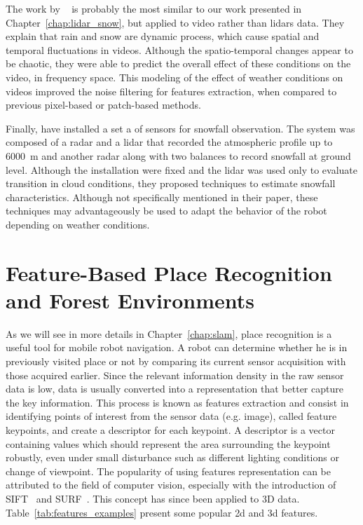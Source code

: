 The work by ~\citet{barnum2010analysis} is probably the most similar to our work presented in Chapter~\ref{chap:lidar_snow}, but applied to video rather than \gls*{lidar}s data. They explain that rain and snow are dynamic process, which cause spatial and temporal fluctuations in videos. Although the spatio-temporal changes appear to be chaotic, they were able to predict the overall effect of these conditions on the video, in frequency space. This modeling of the effect of weather conditions on videos improved the noise filtering for features extraction, when compared to previous pixel-based or patch-based methods.

Finally, \citet{servomaa2002snowfall} have installed a set a of sensors for snowfall observation. The system was composed of a radar and a \gls*{lidar} that recorded the atmospheric profile up to \SI{6000}{\meter} and another radar along with two balances to record snowfall at ground level. Although the installation were fixed and the \gls*{lidar} was used only to evaluate transition in cloud conditions, they proposed techniques to estimate snowfall characteristics. Although not specifically mentioned in their paper, these techniques may advantageously be used to adapt the behavior of the robot depending on weather conditions.  



\section{Feature-Based Place Recognition and Forest Environments}
\label{sec:literature_slam}

As we will see in more details in Chapter~\ref{chap:slam}, place recognition is a useful tool for mobile robot navigation. A robot can determine whether he is in previously visited place or not by comparing its current sensor acquisition with those acquired earlier. Since the relevant information density in the raw sensor data is low, data is usually converted into a representation that better capture the key information. This process is known as features extraction and consist in identifying points of interest from the sensor data (e.g. image), called feature keypoints, and create a descriptor for each keypoint. A descriptor is a vector containing values which should represent the area surrounding the keypoint robustly, even under small disturbance such as different lighting conditions or change of viewpoint. The popularity of using features representation can be attributed to the field of computer vision, especially with the introduction of SIFT~\citep{Lowe2004} and SURF~\citep{Bay2006}. This concept has since been applied to 3D data. Table~\ref{tab:features_examples} present some popular \gls*{2d} and \gls*{3d} features. 

